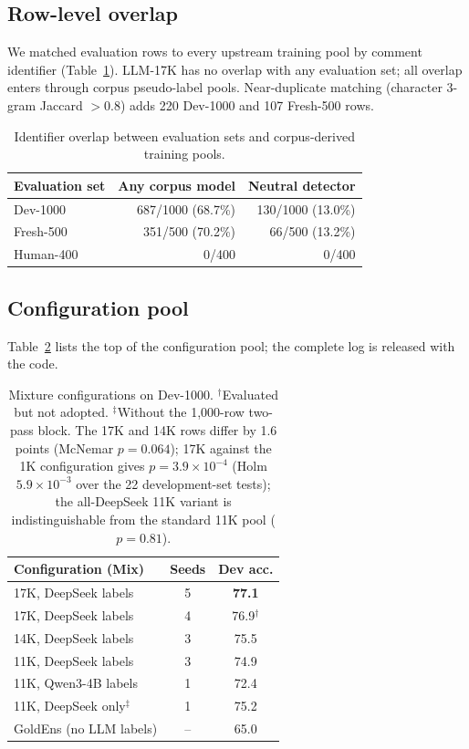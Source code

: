 \subsection{Row-level overlap}
We matched evaluation rows to every upstream training pool by comment
identifier (Table~\ref{tab:overlap}). LLM-17K has no overlap with any
evaluation set; all overlap enters through corpus pseudo-label pools.
Near-duplicate matching (character 3-gram Jaccard $>0.8$) adds 220
Dev-1000 and 107 Fresh-500 rows.

\begin{table}[h]
\centering\footnotesize
\setlength{\tabcolsep}{3pt}
\begin{tabular}{@{}lrr@{}}
\toprule
Evaluation set & Any corpus model & Neutral detector \\
\midrule
Dev-1000   & 687/1000 (68.7\%) & 130/1000 (13.0\%) \\
Fresh-500  & 351/500  (70.2\%) &  66/500  (13.2\%) \\
Human-400  & 0/400 & 0/400 \\
\bottomrule
\end{tabular}
\caption{Identifier overlap between evaluation sets and
corpus-derived training pools.}
\label{tab:overlap}
\end{table}

\subsection{Configuration pool}
Table~\ref{tab:mixpool} lists the top of the configuration pool; the
complete log is released with the code.

\begin{table}[h]
\centering\footnotesize
\setlength{\tabcolsep}{3pt}
\begin{tabular}{@{}lcc@{}}
\toprule
Configuration (Mix) & Seeds & Dev acc. \\
\midrule
17K, DeepSeek labels  & 5 & \textbf{77.1} \\
17K, DeepSeek labels  & 4 & 76.9$^\dagger$ \\
14K, DeepSeek labels  & 3 & 75.5 \\
11K, DeepSeek labels  & 3 & 74.9 \\
11K, Qwen3-4B labels  & 1 & 72.4 \\
11K, DeepSeek only$^\ddagger$ & 1 & 75.2 \\
GoldEns (no LLM labels) & -- & 65.0 \\
\bottomrule
\end{tabular}
\caption{Mixture configurations on Dev-1000. $^\dagger$Evaluated but
not adopted. $^\ddagger$Without the 1{,}000-row two-pass block. The 17K and 14K rows differ by 1.6 points (McNemar
$p{=}0.064$); 17K against the 1K configuration gives
$p{=}3.9{\times}10^{-4}$ (Holm $5.9{\times}10^{-3}$ over the 22
development-set tests); the all-DeepSeek 11K variant is
indistinguishable from the standard 11K pool ($p{=}0.81$).}
\label{tab:mixpool}
\end{table}

